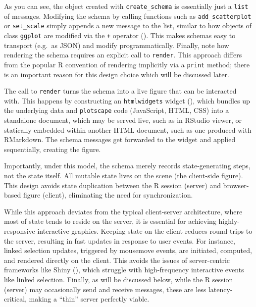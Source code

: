 \documentclass[
  openany]{book}
\theoremstyle{definition}
\theoremstyle{definition}
\theoremstyle{definition}
\theoremstyle{definition}
\theoremstyle{remark}
\begin{document}
As you can see, the object created with \texttt{create\_schema} is essentially just a \texttt{list} of messages. Modifying the schema by calling functions such as \texttt{add\_scatterplot} or \texttt{set\_scale} simply appends a new message to the list, similar to how objects of class \texttt{ggplot} are modified via the \texttt{+} operator (). This makes schemas easy to transport (e.g.~as JSON) and modify programmatically. Finally, note how rendering the schema requires an explicit call to \texttt{render}. This approach differs from the popular R convention of rendering implicitly via a \texttt{print} method; there is an important reason for this design choice which will be discussed later.

The call to \texttt{render} turns the schema into a live figure that can be interacted with. This happens by constructing an \texttt{htmlwidgets} widget (), which bundles up the underlying data and \texttt{plotscape} code (JavaScript, HTML, CSS) into a standalone document, which may be served live, such as in RStudio viewer, or statically embedded within another HTML document, such as one produced with RMarkdown. The schema messages get forwarded to the widget and applied sequentially, creating the figure.

Importantly, under this model, the schema merely records state-generating steps, not the state itself. All mutable state lives on the scene (the client-side figure). This design avoids state duplication between the R session (server) and browser-based figure (client), eliminating the need for synchronization.

While this approach deviates from the typical client-server architecture, where most of state tends to reside on the server, it is essential for achieving highly-responsive interactive graphics. Keeping state on the client reduces round-trips to the server, resulting in fast updates in response to user events. For instance, linked selection updates, triggered by mousemove events, are initiated, computed, and rendered directly on the client. This avoids the issues of server-centric frameworks like Shiny (), which struggle with high-frequency interactive events like linked selection. Finally, as will be discussed below, while the R session (server) may occasionally send and receive messages, these are less latency-critical, making a ``thin'' server perfectly viable.
\end{document}
